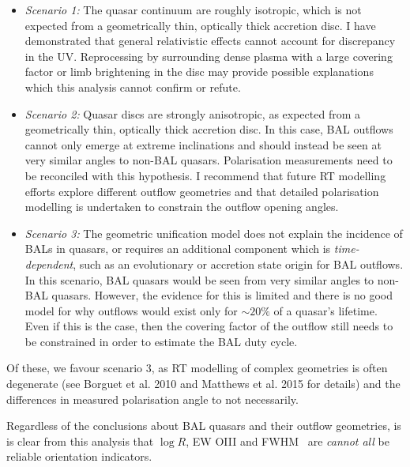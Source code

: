 \begin{itemize}
	\item {\sl Scenario 1:} The quasar continuum are roughly isotropic, which is not 
	expected from a geometrically thin, optically thick accretion disc.
    I have demonstrated that general relativistic effects cannot account for discrepancy in the 
    UV. Reprocessing by surrounding dense plasma with a large covering factor or limb brightening 
    in the disc may provide possible explanations which this analysis cannot confirm or refute.
    \smallskip
	\item {\sl Scenario 2:} Quasar discs are strongly anisotropic, as expected from a 
	geometrically thin, optically thick accretion disc. In this case, BAL outflows cannot 
	only emerge at extreme inclinations and should instead be seen at very similar angles
	to non-BAL quasars. Polarisation measurements need to be reconciled with this hypothesis.
	I recommend that future RT modelling efforts explore different outflow 
	geometries and that detailed polarisation modelling is undertaken to constrain the 
	outflow opening angles.
	\smallskip
	\item  {\sl Scenario 3:} The geometric unification model does not explain the incidence of 
	BALs in quasars, or requires an additional component which is {\em time-dependent}, 
	such as an evolutionary or accretion state origin for BAL outflows. In this scenario, 
	BAL quasars would be seen from very similar angles to non-BAL quasars. However, the 
	evidence for this is limited and there is no good model for why outflows would exist 
	only for $\sim 20\%$ of a quasar's lifetime. Even if this is the case, then the covering 
	factor of the outflow still needs to be constrained in order to estimate the BAL duty cycle.
\end{itemize}
Of these, we favour scenario 3, as RT modelling of complex geometries is often degenerate
(see Borguet et al. 2010 and Matthews et al. 2015 for details) 
and the differences in measured polarisation angle to not necessarily.

Regardless of the conclusions about BAL quasars and their outflow geometries,
is is clear from this analysis that $\log R$, EW OIII
and FWHM \hb\ are {\em cannot all} be reliable orientation indicators.


